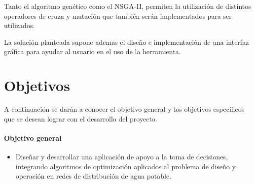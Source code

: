 \documentclass[11pt,letterpaper]{article}
\begin{document}
Tanto el algoritmo genético como el NSGA-II, permiten la utilización de distintos operadores de cruza y mutación que también serán implementados para ser utilizados. 

La solución planteada supone ademas el diseño e implementación de una interfaz gráfica para ayudar al usuario en el uso de la herramienta.

\section{Objetivos}

A continuación se darán a conocer el objetivo general y los objetivos específicos que se desean lograr con el desarrollo del proyecto.

\paragraph{Objetivo general}

\begin{itemize}
\item Diseñar y desarrollar una aplicación de apoyo a la toma de decisiones, integrando algoritmos de optimización aplicados al problema de diseño y operación en redes de distribución de agua potable.
\end{itemize}
\end{document}
